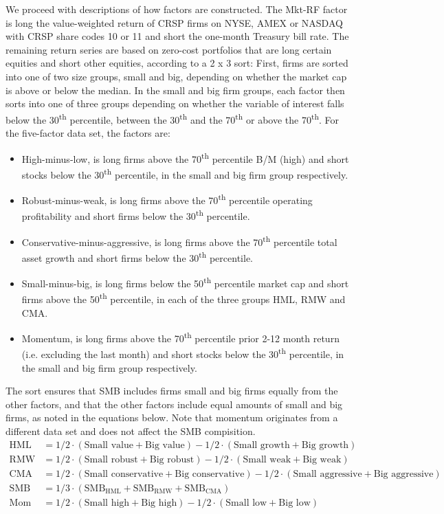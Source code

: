 We proceed with descriptions of how factors are constructed. The Mkt-RF factor is long the value-weighted return of CRSP firms on NYSE, AMEX or NASDAQ with CRSP share codes 10 or 11 and short the one-month Treasury bill rate. The remaining return series are based on zero-cost portfolios that are long certain equities and short other equities, according to a 2 x 3 sort: First, firms are sorted into one of two size groups, small and big, depending on whether the market cap is above or below the median. In the small and big firm groups, each factor then sorts into one of three groups depending on whether the variable of interest falls below the 30\textsuperscript{th} percentile, between the 30\textsuperscript{th} and the 70\textsuperscript{th} or above the 70\textsuperscript{th}. For the five-factor data set, the factors are:
\begin{itemize}
  \item High-minus-low, is long firms above the 70\textsuperscript{th} percentile B/M (high) and short stocks below the 30\textsuperscript{th} percentile, in the small and big firm group respectively.
  \item Robust-minus-weak, is long firms above the 70\textsuperscript{th} percentile operating profitability and short firms below the 30\textsuperscript{th} percentile. 
  \item Conservative-minus-aggressive, is long firms above the 70\textsuperscript{th} percentile total asset growth and short firms below the 30\textsuperscript{th} percentile. 
  \item Small-minus-big, is long firms below the 50\textsuperscript{th} percentile market cap and short firms above the 50\textsuperscript{th} percentile, in each of the three groups HML, RMW and CMA.
  \item Momentum, is long firms above the 70\textsuperscript{th} percentile prior 2-12 month return (i.e. excluding the last month) and short stocks below the 30\textsuperscript{th} percentile, in the small and big firm group respectively.
\end{itemize}
The sort ensures that SMB includes firms small and big firms equally from the other factors, and that the other factors include equal amounts of small and big firms, as noted in the equations below. Note that momentum originates from a different data set and does not affect the SMB compisition.
\begin{align*}
  \text{HML} &= 1/2 \cdot (\text{Small value} + \text{Big value}) - 1/2 \cdot (\text{Small growth} + \text{Big growth}) \\
  \text{RMW} &= 1/2 \cdot (\text{Small robust} + \text{Big robust}) - 1/2 \cdot (\text{Small weak} + \text{Big weak}) \\
  \text{CMA} &= 1/2 \cdot (\text{Small conservative} + \text{Big conservative}) - 1/2 \cdot (\text{Small aggressive} + \text{Big aggressive}) \\
  \text{SMB} &= 1/3 \cdot (\text{SMB}_\text{HML} + \text{SMB}_\text{RMW} + \text{SMB}_\text{CMA}) \\
  \text{Mom} &= 1/2 \cdot (\text{Small high} + \text{Big high}) - 1/2 \cdot (\text{Small low} + \text{Big low})
\end{align*}

